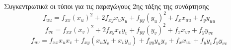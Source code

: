 \documentclass[a4paper,table]{report}
\begin{document}
  \begin{rem}
    Συγκεντρωτικά οι τύποι για τις παραγώγους 2ης τάξης της συνάρτησης 
    \[
      f_{uu}= f_{xx}(x_{u})^{2}+ 2f_{xy}x_{u}y_{u} + f_{yy}(y_{u})^{2} + f_{x}x_{uu} + 
      f_{y}y_{uu} 
    \] 
    \[
      f_{vv}= f_{xx}(x_{v})^{2}+ 2f_{xy}x_{v}y_{v} + f_{yy}(y_{v})^{2} + f_{x}x_{vv} + 
      f_{y}y_{vv} 
    \]
    \[
      f_{uv}= f_{xx}x_{u}x_{v}+ f_{xy}(x_{u}y_{v} + x_{v}y_{u}) + 
      f_{yy}y_{u}y_{v} + f_{x}x_{uv} + f_{y}y_{v} 
      f_{y}y_{vv} 
    \]
  \end{rem}


  
\end{document}
